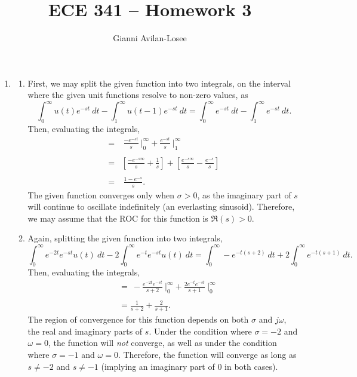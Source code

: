 \documentclass{article}
\title{ECE 341 -- Homework 3}
\author{Gianni Avilan-Losee}
\begin{document}

\begin{enumerate}[label=\thesubsubsection]
\setcounter{section}{4}
\setcounter{subsection}{1}
\setcounter{subsubsection}{1}
\item 
	\begin{enumerate}[label=\alph*)]
		\item First, we may split the given function into two integrals, on the interval where the given unit functions resolve to non-zero values, as
			\[
				\int_{0}^{\infty}u(t)e^{-st} \ dt-\int_{1}^{\infty}u(t-1)e^{-st} \ dt = \int_{0}^{\infty}e^{-st} \ dt - \int_{1}^{\infty}e^{-st} \ dt.
			\]
			Then, evaluating the integrals,
			\begin{align*}
				=& \ \frac{-e^{-st}}{s} \ \Bigg\rvert_{0}^{\infty} + \frac{e^{-st}}{s} \ \Bigg\rvert_{1}^{\infty} \\ \\
				=& \left[\frac{-e^{-s \infty}}{s} + \frac{1}{s}\right] + \left[\frac{e^{-s\infty}}{s}-\frac{e^{-s}}{s}\right] \\ \\
				=& \ \frac{1-e^{-s}}{s}.
			\end{align*}
			The given function converges only when \(\sigma > 0\), as the imaginary part of \(s\) will continue to oscillate indefinitely (an everlasting sinusoid). Therefore, we may assume that the ROC for this function is \(\Re{(s)} > 0\).
			\addtocounter{enumii}{2}
		\item Again, splitting the given function into two integrals,
			\[
				\int_{0}^{\infty}e^{-2t}e^{-st}u(t) \ dt - 2 \int_{0}^{\infty}e^{-t}e^{-st}u(t) \ dt = \int_{0}^{\infty}-e^{-t(s+2)} \ dt + 2\int_{0}^{\infty}e^{-t(s+1)} \ dt. 
			\]
			Then, evaluating the integrals,
			\begin{align*}
				&= \ -\frac{e^{-2t}e^{-st}}{s+2} \ \Bigg\rvert_{0}^{\infty} + \frac{2e^{-t}e^{-st}}{s+1} \ \Bigg\rvert_{0}^{\infty} \\ \\
				&=\frac{1}{s+2} + \frac{2}{s+1}.
			\end{align*}
			The region of convergence for this function depends on both \(\sigma\) and \(j\omega\), the real and imaginary parts of \(s\). Under the condition where \(\sigma = -2\) and \(\omega = 0\), the function will \textit{not} converge, as well as under the condition where \(\sigma = -1\) and \(\omega = 0\). Therefore, the function will converge as long as \(s \neq -2\) and \(s \neq -1\) (implying an imaginary part of \(0\) in both cases).

\end{enumerate}
\end{enumerate}
\end{document}
